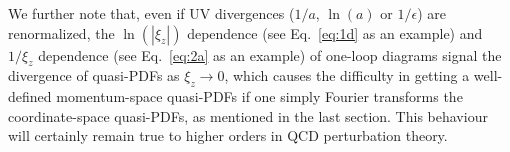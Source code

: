 We further note that, even if UV divergences ($1/a$, $\ln(a)$ or $1/\epsilon$) are renormalized, the $\ln(|\xi_z|)$ dependence (see Eq.~\ref{eq:1d} as an example) and $1/\xi_z$ dependence (see Eq.~\ref{eq:2a} as an example) of one-loop diagrams signal the divergence of quasi-PDFs as $\xi_z\to 0$, which causes the difficulty in getting a well-defined momentum-space quasi-PDFs if one simply Fourier transforms the coordinate-space quasi-PDFs, as mentioned in the last section. This behaviour will certainly remain true to higher orders in QCD perturbation theory.
